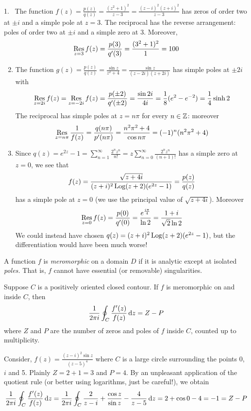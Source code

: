 \begin{examples}{}{}
\hangindent\leftmargini
\textup{1.} \ The function $f(z)=\frac{p(z)}{q(z)}=\frac{(z^2+1)^2}{z-3}=\frac{(z-i)^2(z+i)^2}{z-3}$ has zeros of order two at $\pm i$ and a simple pole at $z=3$. The reciprocal has the reverse arrangement: poles of order two at $\pm i$ and a simple zero at $3$. Moreover,
  \[\operatorname*{Res}_{z=3}f(z)=\frac{p(3)}{q'(3)}=\frac{(3^2+1)^2}{1}=100\]
\begin{enumerate}\setcounter{enumi}{1}
  \item The function $g(z)=\frac{p(z)}{q(z)}=\frac{\sin z}{z^2+4} =\frac{\sin z}{(z-2i)(z+2i)}$ has simple poles at $\pm 2i$  with 
  \[\operatorname*{Res}_{z=2i}f(z)=\operatorname*{Res}_{z=-2i}f(z)=\frac{p(\pm 2)}{q'(\pm 2)}=\frac{\sin 2i}{4i}=\frac 18(e^2-e^{-2}) =\frac 14\sinh 2\]
  The reciprocal has simple poles at $z=n\pi$ for every $n\in\mathbb{Z}$: moreover
  \[\operatorname*{Res}_{z=n\pi}\frac 1{f(z)}=\frac{q(n\pi)}{p'(n\pi)}=\frac{n^2\pi^2+4}{\cos n\pi}= (-1)^n(n^2\pi^2+4)\]
  
  \item Since $q(z)=e^{2z}-1=\sum\limits_{n=1}^\infty\frac{2^nz^n}{n!}=z\sum\limits_{n=0}^\infty\frac{2^nz^n}{(n+1)!}$ has a simple zero at $z=0$, we see that
  \[f(z)=\frac{\sqrt{z+4i}}{(z+i)^2\operatorname{Log}(z+2)(e^{2z}-1)}=\frac{p(z)}{q(z)}\]
  has a simple pole at $z=0$ (we use the principal value of $\sqrt{z+4i}$). Moreover
  \[\operatorname*{Res}_{z=0}f(z)=\frac{p(0)}{q'(0)}=\frac{e^{\frac{i\pi}{4}}}{\ln 2} =\frac{1+i}{\sqrt 2\ln 2}\]
  We could instead have chosen $q(z)=(z+i)^2\operatorname{Log}(z+2)(e^{2z}-1)$, but the differentiation would have been much worse!
\end{enumerate}
\end{examples}
\goodbreak


\begin{defn}{}{}
A function $f$ is \emph{meromorphic} on a domain $D$ if it is analytic except at isolated \emph{poles.} That is, $f$ cannot have essential (or removable) singularities. 
\end{defn}

\begin{thm}{}{}
Suppose $C$ is a positively oriented closed contour. If $f$ is meromorphic on and inside $C$, then
\[\frac 1{2\pi i}\oint_C\frac{f'(z)}{f(z)}\,{\mathrm{d} z} =Z-P\]
where $Z$ and $P$ are the number of zeros and poles of $f$ inside $C$, counted up to multiplicity.
\end{thm}

\begin{example}{}{}
Consider, $f(z)=\frac{(z-i)^2\sin z}{(z-5)^4}$ where $C$ is a large circle surrounding the points 0, $i$ and 5. Plainly $Z=2+1=3$ and $P=4$. By an unpleasant application of the quotient rule (or better using logarithms, just be careful!), we obtain
\[\frac 1{2\pi i}\oint_C\frac{f'(z)}{f(z)}\,{\mathrm{d} z} =\frac 1{2\pi i}\oint_C\frac 2{z-i}+\frac{\cos z}{\sin z}-\frac 4{z-5}\,{\mathrm{d} z} =2+\cos 0-4=-1 =Z-P\]
\end{example}

